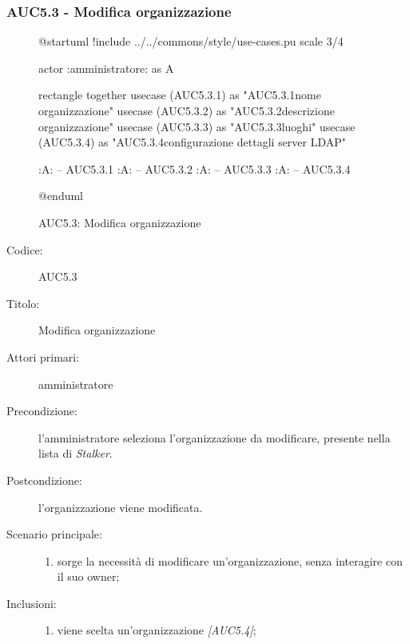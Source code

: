 \documentclass[../analisi-dei-requisiti.tex]{subfiles}
\begin{document}
\subsubsection{AUC5.3 - Modifica organizzazione}%
\label{subsub:AUC5.3}

\begin{figure}[h!]
  \centering
  \begin{plantuml}
  @startuml
  !include ../../commons/style/use-cases.pu
  scale 3/4

  actor :amministratore: as A

  rectangle {
    together {
      usecase (AUC5.3.1) as "AUC5.3.1\nModifica nome organizzazione"
      usecase (AUC5.3.2) as "AUC5.3.2\nModifica descrizione organizzazione"
      usecase (AUC5.3.3) as "AUC5.3.3\nGestione luoghi"
      usecase (AUC5.3.4) as "AUC5.3.4\nModifica configurazione dettagli server LDAP"
    }
  }

  :A: -- AUC5.3.1
  :A: -- AUC5.3.2
  :A: -- AUC5.3.3
  :A: -- AUC5.3.4

  @enduml
  \end{plantuml}
  \caption{AUC5.3: Modifica organizzazione}
  \label{fig:AUC5_3}
\end{figure}

\begin{description}
  \item[Codice:] AUC5.3
  \item[Titolo:] Modifica organizzazione
  \item[Attori primari:] amministratore
  \item[Precondizione:] l'amministratore seleziona l'organizzazione da modificare, presente nella lista di \emph{Stalker}.
  \item[Postcondizione:] l'organizzazione viene modificata.
  \item[Scenario principale:]
  \begin{enumerate}
    \item sorge la necessità di modificare un'organizzazione, senza interagire con il suo owner;
  \end{enumerate}
  \item[Inclusioni:]
  \begin{enumerate}
    \item viene scelta un'organizzazione \emph{[AUC5.4]};
  \end{enumerate}
\end{description}
\end{document}
